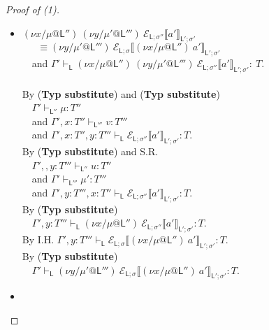 \documentclass{sigplanconf}
\newcommand{\lab}{\mathsf L}
\newcommand{\new}[2]{(\nu #1)\:#2}
\newcommand{\fork}[2]{#1\Rsh\:\!#2}
\newcommand{\llctx}[3]{\mathcal E_{#1}\llbracket#2\rrbracket_{#3}}
\newcommand{\sctx}[2]{\mathcal E_{\lab;\sigma}\llbracket#1\rrbracket_{#2}}
\newcommand{\trule}[1]{(\textbf{Typ #1})}
\begin{document}
\begin{proof}[Proof of (1)]
\begin{itemize}
$~~~$ and $\Gamma', x: T'' \vdash_{\lab} b'
  : T'''$.\\
By \trule{substitute} and S.R.\\
$~~~$ $\Gamma' \vdash_{\lab} \new{x/\mu@\lab''}\llctx{\lab;\sigma''}{a'}{\lab';\sigma'}
  : T$\\
$~~~$ and $\Gamma' \vdash_{\lab} b'
  : T'''$.\\
By I.H. $\Gamma' \vdash_{\lab} \sctx{\new{x/\mu@\lab''}a'}{\lab';\sigma'}
  : T$.\\
By \trule{fork}\\
$~~~$ $\Gamma' \vdash_{\lab} \fork{b'} {\sctx{\new{x/\mu@\lab''}a'}{\lab';\sigma'}}
  : T$.\\
\item 
$\new{x/\mu@\lab''}\new{y/\mu'@\lab'''} {\llctx{\lab;\sigma''}{a'}{\lab';\sigma'}}$\\
$~~~~~~~ \equiv\new{y/\mu'@\lab'''} {\sctx{\new{x/\mu@\lab''}a'}{\lab';\sigma'}}$\\
$~~~$ and $\Gamma' \vdash_{\lab} \new{x/\mu@\lab''}\new{y/\mu'@\lab'''} {\llctx{\lab;\sigma''}{a'}{\lab';\sigma'}}
  :~T$.\\
  \\
By \trule{substitute} and \trule{substitute} \\
$~~~$ $\Gamma' \vdash_{\lab''} \mu
  : T''$\\
$~~~$ and $\Gamma', x: T'' \vdash_{\lab'''} v
  : T'''$\\
$~~~$ and $\Gamma', x: T'', y : T''' \vdash_{\lab} \llctx{\lab;\sigma''}{a'}{\lab';\sigma'}
  : T$.\\
By \trule{substitute} and S.R.\\
$~~~$ $\Gamma', , y: T''' \vdash_{\lab''} u
  : T''$\\
$~~~$ and $\Gamma' \vdash_{\lab'''} \mu'
  : T'''$\\
$~~~$ and $\Gamma', y : T''',x: T'' \vdash_{\lab} \llctx{\lab;\sigma''}{a'}{\lab';\sigma'}
  : T$.\\
By \trule{substitute} \\
$~~~$ $\Gamma', y : T''' \vdash_{\lab} \new{x/\mu@\lab''}\llctx{\lab;\sigma''}{a'}{\lab';\sigma'}
  : T$.\\
By I.H. $\Gamma', y : T''' \vdash_{\lab} \sctx{\new{x/\mu@\lab''}a'}{\lab';\sigma'}
  : T$.\\
By \trule{substitute} \\
$~~~$ $\Gamma' \vdash_{\lab} \new{y/\mu'@\lab'''} {\sctx{\new{x/\mu@\lab''}a'}{\lab';\sigma'}}
  : T$.\\
\item 

\end{itemize}
\end{proof}
\end{document}
